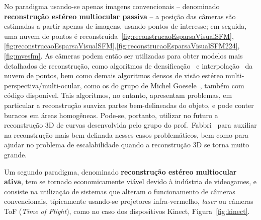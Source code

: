 No paradigma usando-se apenas imagens convencionais -- denominado
\textbf{reconstrução estéreo multiocular passiva} --  a posição das câmeras são
estimadas a partir apenas de imagens, usando pontos de interesse; em seguida, uma
nuvem de pontos é reconstruída~\ref{fig:reconstrucaoEsparsaVisualSFM},\ref{fig:reconstrucaoEsparsaVisualSFM},\ref{fig:reconstrucaoEsparsaVisualSFM224}, \ref{fig:mvesfm}.
As câmeras podem então ser utilizadas para obter modelos mais detalhados de
reconstrução, como algoritmos de densificação~\cite{furukawa2007dense} e
interpolação~\cite{poisson} da nuvem de pontos, bem como demais algoritmos
densos de visão estéreo multi-perspectiva/multi-ocular, como os do grupo de
Michel Goesele~\cite{mve}, também com código disponível. Tais algoritmos, no
entanto, apresentam problemas, em particular a reconstrução suaviza partes
bem-delineadas do objeto, e pode conter buracos em áreas homogêneas. Pode-se,
portanto, utilizar no futuro a reconstrução 3D de curvas 
desenvolvida pelo grupo do prof.~Fabbri~\cite{Usumezbas:Fabbri:Kimia:ECCV16,Fabbri:Kimia:IJCV2016,Fabbri:Kimia:CVPR10,Fabbri:Giblin:Kimia:ECCV12}
para auxiliar na reconstrução mais bem-delinada nesses casos problemáticos, bem
como para ajudar no problema de escalabilidade quando a reconstrução 3D se torna
muito grande.  

Um segundo paradigma, denominado \textbf{reconstrução estéreo
multiocular ativa}, tem se tornado economicamente viável devido à indústria de videogames, e
consiste na utilização de sistemas que alteram o funcionamento de câmeras
convencionais, típicamente usando-se projetores infra-vermelho, \emph{laser} ou câmeras
ToF (\emph{Time of Flight}), como no caso dos dispositivos Kinect,
Figura~\ref{fig:kinect}.

